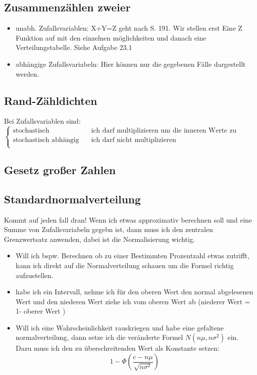 \documentclass[10pt,a4paper]{article}
\begin{document}
		\subsection{Zusammenzählen zweier }
		\begin{itemize}
			\item unabh. Zufallsvariablen: X+Y=Z geht nach S. 191. Wir stellen erst Eine Z Funktion auf mit den einzelnen möglichkeiten und danach eine Verteilungstabelle. Siehe Aufgabe 23.1
			\item abhängige Zufallsvariabeln: Hier können nur die gegebenen Fälle dargestellt werden.
		\end{itemize}
	\subsection{Rand-Zähldichten}
	Bei Zufallsvariablen sind: $\begin{cases}
		\text{stochastisch unabhängig} & \text{ich darf multiplizieren um die inneren Werte zu kriegen}\\ \text{stochastisch abhängig} & \text{ich darf nicht multiplizieren}\\
	\end{cases}$ 
	\subsection{Gesetz großer Zahlen}
	\subsection{Standardnormalverteilung}
	Kommt auf jeden fall dran! Wenn ich etwas approximativ berechnen soll und eine Summe von Zufallsvariabeln gegebn ist, dann muss ich den zentralen Grenzwertsatz anwenden, dabei ist die Normalisierung wichtig.
	\begin{itemize}
		\item Will ich bspw. Berechnen ob zu einer Bestimmten Prozentzahl etwas zutrifft, kann ich direkt auf die Normalverteilung schauen um die Formel richtig aufzustellen.
		\item habe ich ein Intervall, nehme ich für den oberen Wert den normal abgelesenen Wert und den niederen Wert ziehe ich vom oberen Wert ab (niederer Wert = 1- oberer Wert )
		\item Will ich eine Wahrscheinlichkeit rauskriegen und habe eine gefaltene normalverteilung, dann setze ich die veränderte Formel $N(n\mu,n\sigma^2)$ ein. Dazu muss ich den zu überschreitenden Wert als Konstante setzen: $$1- \Phi (\frac{c-n\mu}{\sqrt{n\sigma^2}})$$ 
	\end{itemize}
\end{document}
